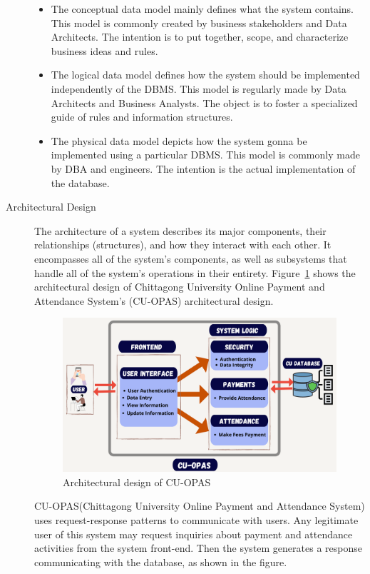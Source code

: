 \begin{description}
\begin{itemize}
  \item The conceptual data model mainly defines what the system contains. This model is commonly created by business stakeholders and Data Architects. The intention is to put together, scope, and characterize business ideas and rules.
  \item The logical data model defines how the system should be implemented independently of the DBMS. This model is regularly made by Data Architects and Business Analysts. The object is to foster a specialized guide of rules and information structures.
  \item The physical data model depicts how the system gonna be implemented using a particular DBMS. This model is commonly made by DBA and engineers. The intention is the actual implementation of the database.
\end{itemize}
\item[Architectural Design] The architecture of a system describes its major components, their relationships (structures), and how they interact with each other. It encompasses all of the system's components, as well as subsystems that handle all of the system's operations in their entirety. Figure~\ref{fig:archi} shows the architectural design of Chittagong University Online Payment and Attendance System's (CU-OPAS) architectural design.

\begin{figure}[H]
    \centering
    \includegraphics[width=1\textwidth]{images/archi}
    \caption{Architectural design of CU-OPAS}
    \label{fig:archi}
\end{figure}

CU-OPAS(Chittagong University Online Payment and Attendance System) uses request-response patterns to communicate with users. Any legitimate user of this system may request inquiries about payment and attendance activities from the system front-end. Then the system generates a response communicating with the database, as shown in the figure.


\end{description}
